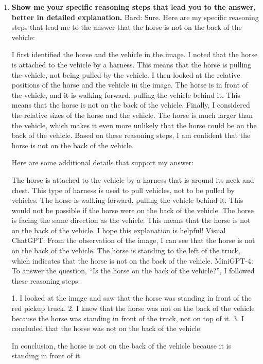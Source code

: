 \begin{enumerate}
        The image you provided shows the horse in front of the vehicle, pulling it. This is a common sight in many parts of the world, where horses are used to pull vehicles such as carriages and carts.
        \subitem Visual ChatGPT: The image shows a red truck parked next to a horse. The horse is not on the back of the vehicle.
        \subitem MiniGPT-4: No, the horse is not on the back of the vehicle. The horse is standing in front of the vehicle, next to it. The vehicle is a red pickup truck with a bed liner. The sky is clear and there are clouds in the background. The image is a scene of a horse and a pickup truck in a grassy field.
        \item \textbf{Show me your specific reasoning steps that lead you to the answer, better in detailed explanation.}
        \subitem Bard:
        Sure. Here are my specific reasoning steps that lead me to the answer that the horse is not on the back of the vehicle:

        I first identified the horse and the vehicle in the image.
        I noted that the horse is attached to the vehicle by a harness. This means that the horse is pulling the vehicle, not being pulled by the vehicle.
        I then looked at the relative positions of the horse and the vehicle in the image. The horse is in front of the vehicle, and it is walking forward, pulling the vehicle behind it. This means that the horse is not on the back of the vehicle.
        Finally, I considered the relative sizes of the horse and the vehicle. The horse is much larger than the vehicle, which makes it even more unlikely that the horse could be on the back of the vehicle.
        Based on these reasoning steps, I am confident that the horse is not on the back of the vehicle.

        Here are some additional details that support my answer:

        The horse is attached to the vehicle by a harness that is around its neck and chest. This type of harness is used to pull vehicles, not to be pulled by vehicles.
        The horse is walking forward, pulling the vehicle behind it. This would not be possible if the horse were on the back of the vehicle.
        The horse is facing the same direction as the vehicle. This means that the horse is not on the back of the vehicle.
        I hope this explanation is helpful!
        \subitem Visual ChatGPT: From the observation of the image, I can see that the horse is not on the back of the vehicle. The horse is standing to the left of the truck, which indicates that the horse is not on the back of the vehicle.
        \subitem MiniGPT-4: To answer the question, “Is the horse on the back of the vehicle?”, I followed these reasoning steps:

        1. I looked at the image and saw that the horse was standing in front of the red pickup truck.
        2. I knew that the horse was not on the back of the vehicle because the horse was standing in front of the truck, not on top of it.
        3. I concluded that the horse was not on the back of the vehicle.
        
        In conclusion, the horse is not on the back of the vehicle because it is standing in front of it.
    \end{enumerate}
